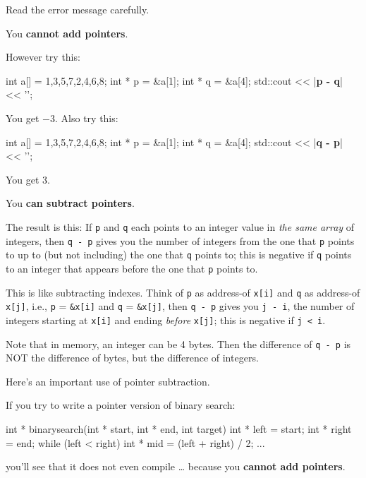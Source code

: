 Read the error message carefully.

You \textbf{cannot add pointers}.

However try this:

\begin{consolethree}[escapeinside=||]
int a[] = {1,3,5,7,2,4,6,8};
int * p = &a[1];
int * q = &a[4];
std::cout << |{\bf p - q}| << '\n';
\end{consolethree}

You get $-3$. Also try this:

\begin{consolethree}[escapeinside=||]
int a[] = {1,3,5,7,2,4,6,8};
int * p = &a[1];
int * q = &a[4];
std::cout << |{\bf q - p}| << '\n';
\end{consolethree}

You get $3$.

You \textbf{can subtract pointers}.

The result is this: If \texttt{p} and \texttt{q} each points to an integer
value in \textit{the same array} of integers, then
\texttt{q - p}
gives you the number of integers from the one that \texttt{p} points to
up to (but not including) the one that \texttt{q} points to; this is
negative if \texttt{q} points to an integer that appears before the one
that \texttt{p} points to.

This is like subtracting indexes. Think of \texttt{p} as address-of \texttt{x[i]} and
\texttt{q} as address-of \texttt{x[j]}, i.e., \texttt{p} = \verb!&x[i]! and \texttt{q} = \verb!&x[j]!, then
\verb!q - p! gives you \verb!j - i!, the number of integers starting at
\texttt{x[i]} and ending \textit{before} \texttt{x[j]}; this is negative if
\verb!j < i!.

Note that in memory, an integer can be 4 bytes. Then the difference of
\verb!q - p! is NOT the difference of bytes, but the difference of
integers.

Here's an important use of pointer subtraction.

If you try to write a pointer version of binary search:

\begin{consolethree}[escapeinside=||]
int * binarysearch(int * start, int * end,
                   int target)
{
    int * left = start;
    int * right = end;
    while (left < right)
    {
        int * mid = (left + right) / 2;
        ...
    }
}
\end{consolethree}

you'll see that it does not even compile \ldots{} because you
\textbf{cannot add pointers}.

